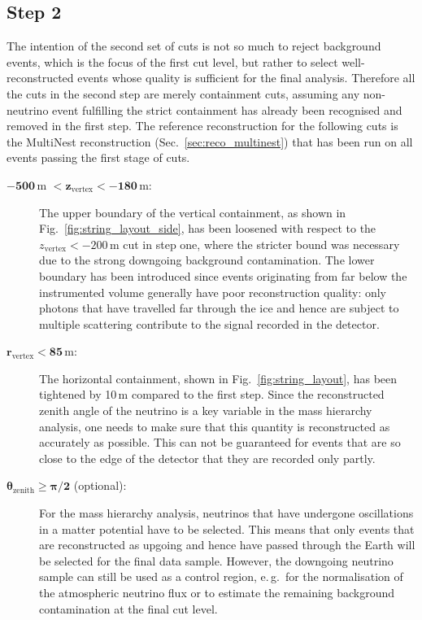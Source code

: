 \subsection{Step 2}
\label{sec:cuts_step2}

The intention of the second set of cuts is not so much to reject background
events, which is the focus of the first cut level, but rather to select
well-reconstructed events whose quality is sufficient for the final analysis.
Therefore all the cuts in the second step are merely containment cuts, assuming
any non-neutrino event fulfilling the strict containment has already been
recognised and removed in the first step. The reference reconstruction for the
following cuts is the MultiNest reconstruction (Sec.~\ref{sec:reco_multinest})
that has been run on all events passing the first stage of cuts.

\begin{description}
 \item[$\mathbf{-500}$\,m $\mathbf{< z_\mathrm{vertex} < -180}$\,m:] The upper
  boundary of the vertical containment, as shown in
  Fig.~\ref{fig:string_layout_side}, has been loosened with respect to the
  $z_\mathrm{vertex} < -200$\,m cut in step one, where the stricter bound was
  necessary due to the strong downgoing background contamination. The lower
  boundary has been introduced since events originating from far below the
  instrumented volume generally have poor reconstruction quality: only
  photons that have travelled far through the ice and hence are subject to
  multiple scattering contribute to the signal recorded in the detector.

 \item[$\mathbf{r_\mathrm{vertex} < 85}$\,m:] The horizontal containment, shown
  in Fig.~\ref{fig:string_layout}, has  been tightened by 10\,m compared to the
  first step. Since the reconstructed  zenith angle of the neutrino is a key
  variable in the mass hierarchy  analysis, one needs to make sure that this
  quantity is reconstructed as accurately as possible. This can not be
  guaranteed for events that are so  close to the edge of the detector that they
  are recorded only partly.

 \item[$\mathbf{\theta_\mathrm{zenith} \geq \pi/2}$ (optional):] For the mass
  hierarchy analysis, neutrinos that have undergone oscillations in a matter
  potential have to be selected. This means that only events that are
  reconstructed as upgoing and hence have passed through the Earth will be
  selected for the final data sample. However, the downgoing neutrino sample
  can still be used as a control region, e.\,g.\ for the normalisation of the
  atmospheric neutrino flux or to estimate the remaining background
  contamination at the final cut level.
\end{description}

